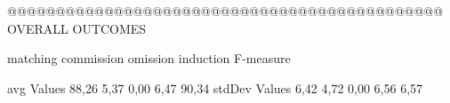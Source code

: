  @@@@@@@@@@@@@@@@@@@@@@@@@@@@@@@@@@@@@@@@@@@@@ OVERALL OUTCOMES

            matching commission   omission  induction  F-measure

avg Values      88,26    5,37       0,00      6,47       90,34       
stdDev Values    6,42    4,72       0,00      6,56        6,57       
